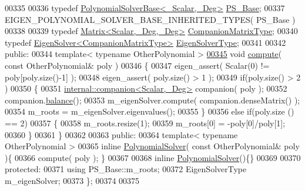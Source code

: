 \begin{DoxyCode}
00335 
00336     \textcolor{keyword}{typedef} \hyperlink{class_eigen_1_1_polynomial_solver_base}{PolynomialSolverBase<\_Scalar,\_Deg>}    
      \hyperlink{class_eigen_1_1_polynomial_solver_base}{PS\_Base};
00337     EIGEN\_POLYNOMIAL\_SOLVER\_BASE\_INHERITED\_TYPES( PS\_Base )
00338 
00339     \textcolor{keyword}{typedef} \hyperlink{group___core___module_class_eigen_1_1_matrix}{Matrix<Scalar,\_Deg,\_Deg>}                 
      \hyperlink{group___core___module_class_eigen_1_1_matrix}{CompanionMatrixType};
00340     \textcolor{keyword}{typedef} \hyperlink{group___eigenvalues___module}{EigenSolver<CompanionMatrixType>}         
      \hyperlink{group___eigenvalues___module}{EigenSolverType};
00341 
00342   \textcolor{keyword}{public}:
00344     \textcolor{keyword}{template}< \textcolor{keyword}{typename} OtherPolynomial >
\hyperlink{class_eigen_1_1_polynomial_solver_ac3ceae48528f3798d44c15a025cb03b8}{00345}     \textcolor{keywordtype}{void} \hyperlink{class_eigen_1_1_polynomial_solver_ac3ceae48528f3798d44c15a025cb03b8}{compute}( \textcolor{keyword}{const} OtherPolynomial& poly )
00346     \{
00347       eigen\_assert( Scalar(0) != poly[poly.size()-1] );
00348       eigen\_assert( poly.size() > 1 );
00349       \textcolor{keywordflow}{if}(poly.size() >  2 )
00350       \{
00351         \hyperlink{class_eigen_1_1internal_1_1companion}{internal::companion<Scalar,\_Deg>} companion( poly );
00352         companion.\hyperlink{class_eigen_1_1internal_1_1companion_a7362d054f04f6d554fb6c8a279287000}{balance}();
00353         m\_eigenSolver.compute( companion.denseMatrix() );
00354         m\_roots = m\_eigenSolver.eigenvalues();
00355       \}
00356       \textcolor{keywordflow}{else} \textcolor{keywordflow}{if}(poly.size () == 2)
00357       \{
00358         m\_roots.resize(1);
00359         m\_roots[0] = -poly[0]/poly[1];
00360       \}
00361     \}
00362 
00363   \textcolor{keyword}{public}:
00364     \textcolor{keyword}{template}< \textcolor{keyword}{typename} OtherPolynomial >
00365     \textcolor{keyword}{inline} \hyperlink{class_eigen_1_1_polynomial_solver}{PolynomialSolver}( \textcolor{keyword}{const} OtherPolynomial& poly )\{
00366       compute( poly ); \}
00367 
00368     \textcolor{keyword}{inline} \hyperlink{class_eigen_1_1_polynomial_solver}{PolynomialSolver}()\{\}
00369 
00370   \textcolor{keyword}{protected}:
00371     \textcolor{keyword}{using}                   PS\_Base::m\_roots;
00372     EigenSolverType         m\_eigenSolver;
00373 \};
00374 
00375 

\end{DoxyCode}
